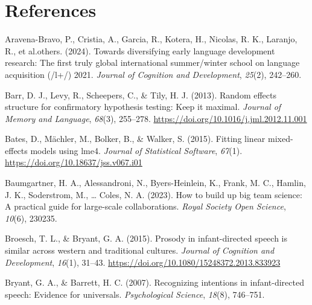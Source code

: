 \documentclass[
  ,man,floatsintext]{apa6}
\newlength{\cslhangindent}
\newlength{\cslentryspacingunit} %
\newenvironment{CSLReferences}[2] %
 {%
  \setlength{\parindent}{0pt}
  \ifodd #1
  \let\oldpar\par
  \def\par{\hangindent=\cslhangindent\oldpar}
  \fi
  \setlength{\parskip}{#2\cslentryspacingunit}
 }%
 {}
\begin{document}
\newpage

\hypertarget{references}{%
\section{References}\label{references}}

\begingroup
\setlength{\parindent}{-0.5in}
\setlength{\leftskip}{0.5in}

\hypertarget{refs}{}
\begin{CSLReferences}{1}{0}
\leavevmode{}%
Aravena-Bravo, P., Cristia, A., Garcia, R., Kotera, H., Nicolas, R. K., Laranjo, R., et al.others. (2024). Towards diversifying early language development research: The first truly global international summer/winter school on language acquisition (/l+/) 2021. \emph{Journal of Cognition and Development}, \emph{25}(2), 242--260.

\leavevmode{}%
Barr, D. J., Levy, R., Scheepers, C., \& Tily, H. J. (2013). Random effects structure for confirmatory hypothesis testing: Keep it maximal. \emph{Journal of Memory and Language}, \emph{68}(3), 255--278. \url{https://doi.org/10.1016/j.jml.2012.11.001}

\leavevmode{}%
Bates, D., Mächler, M., Bolker, B., \& Walker, S. (2015). Fitting linear mixed-effects models using lme4. \emph{Journal of Statistical Software}, \emph{67}(1). \url{https://doi.org/10.18637/jss.v067.i01}

\leavevmode{}%
Baumgartner, H. A., Alessandroni, N., Byers-Heinlein, K., Frank, M. C., Hamlin, J. K., Soderstrom, M., \ldots{} Coles, N. A. (2023). How to build up big team science: A practical guide for large-scale collaborations. \emph{Royal Society Open Science}, \emph{10}(6), 230235.

\leavevmode{}%
Broesch, T. L., \& Bryant, G. A. (2015). Prosody in infant-directed speech is similar across western and traditional cultures. \emph{Journal of Cognition and Development}, \emph{16}(1), 31--43. \url{https://doi.org/10.1080/15248372.2013.833923}

\leavevmode{}%
Bryant, G. A., \& Barrett, H. C. (2007). Recognizing intentions in infant-directed speech: Evidence for universals. \emph{Psychological Science}, \emph{18}(8), 746--751.


\end{CSLReferences}
\end{document}
